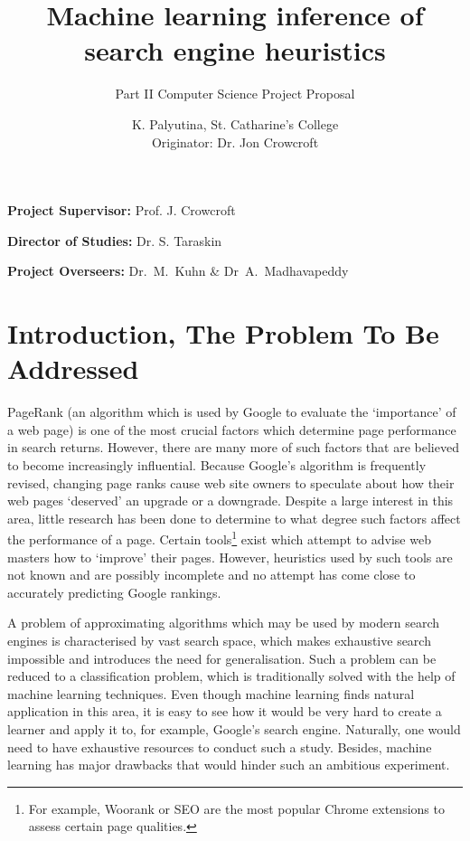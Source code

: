 

\title{Machine learning inference of search engine heuristics}
\subtitle{Part II Computer Science Project Proposal}
\author{K. Palyutina, St. Catharine's College \\
        Originator: Dr. Jon Crowcroft}
\maketitle


\vfil


\noindent
{\bf Project Supervisor:} Prof. J. Crowcroft
\vspace{0.2in}

\noindent
{\bf Director of Studies:} Dr. S. Taraskin
\vspace{0.2in}
\noindent
 
\noindent
{\bf Project Overseers:} Dr.~M.~Kuhn  \& Dr~A.~Madhavapeddy



\section*{\bf Introduction, The Problem To Be Addressed}
PageRank (an algorithm which is used by Google to evaluate the `importance' of a web page) is one of the most crucial factors which determine page performance in search returns. However, there are many more of such factors that are believed to become increasingly influential. Because Google's algorithm is frequently revised, changing page ranks cause web site owners to speculate about how their web pages `deserved' an upgrade or a downgrade. Despite a large interest in this area, little research has been done to determine to what degree such factors affect the performance of a page. Certain tools\footnote{For example, Woorank or SEO are the most popular Chrome extensions to assess certain page qualities.} exist which attempt to advise web masters how to `improve' their pages. However, heuristics used by such tools are not known and are possibly incomplete and no attempt has come close to accurately predicting Google rankings.

A problem of approximating algorithms which may be used by modern search engines is characterised by vast search space, which makes exhaustive search impossible and introduces the need for generalisation. Such a problem can be reduced to a classification problem, which is traditionally solved with the help of machine learning techniques. Even though machine learning finds natural application in this area, it is easy to see how it would be very hard to create a learner and apply it to, for example, Google's search engine. Naturally, one would need to have exhaustive resources to conduct such a study. Besides, machine learning has major drawbacks that would hinder such an ambitious experiment.


